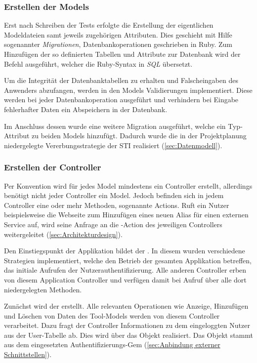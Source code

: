 \subsubsection{Erstellen der Models}
\label{sec:Erstellen der Models}
Erst nach Schreiben der Tests erfolgte die Erstellung der eigentlichen Modeldateien samt jeweils
zugehörigen Attributen. Dies geschieht mit Hilfe sogenannter \textit{Migrationen},
Datenbankoperationen geschrieben in Ruby. Zum Hinzufügen der so definierten Tabellen und Attribute
zur Datenbank wird der Befehl  ausgeführt, welcher die Ruby-Syntax in
\textit{\acs{SQL}} übersetzt.

Um die Integrität der Datenbanktabellen zu erhalten und \ggfs Falscheingaben des Anwenders abzufangen,
werden in den Models Validierungen implementiert. Diese werden bei jeder Datenbankoperation
ausgeführt und verhindern bei Eingabe fehlerhafter Daten ein Abspeichern in der Datenbank.
\newline
{}

Im Anschluss dessen wurde eine weitere Migration ausgeführt, welche ein Typ-Attribut zu
beiden Models hinzufügt. Dadurch wurde die in der Projektplanung niedergelegte Vererbungsstrategie
der \acs{STI} realisiert (\Vgl \ref{sec:Datenmodell}).

\subsubsection{Erstellen der Controller}
\label{sec:Erstellen der Controller}
Per Konvention wird für jedes Model mindestens ein Controller erstellt, allerdings benötigt nicht jeder
Controller ein Model. Jedoch befinden sich in jedem Controller eine oder mehr Methoden, sogenannte
Actions. Ruft ein Nutzer beispielsweise die Webseite zum Hinzufügen eines neuen Alias für einen
externen Service auf, wird seine Anfrage an die -Action des jeweiligen Controllers weitergeleitet
(\Vgl \ref{sec:Architekturdesign}).

Den Einstiegspunkt der Applikation bildet der . In diesem wurden
verschiedene Strategien implementiert, welche den Betrieb der gesamten Applikation betreffen,
\bspw das initiale Aufrufen der Nutzerauthentifizierung. Alle anderen Controller erben von diesem
Application Controller und verfügen damit bei Aufruf über alle dort niedergelegten Methoden.

Zunächst wird der  erstellt. Alle relevanten Operationen
wie Anzeige, Hinzufügen und Löschen von Daten des Tool-Models werden von diesem Controller
verarbeitet. Dazu fragt der Controller Informationen zu dem eingeloggten Nutzer aus der User-Tabelle
ab. Dies wird über das Objekt  realisiert. Das Objekt stammt aus dem
eingesetzten Authentifizierungs-Gem  (\Vgl \ref{sec:Anbindung externer Schnittstellen}).
\newline
{}

